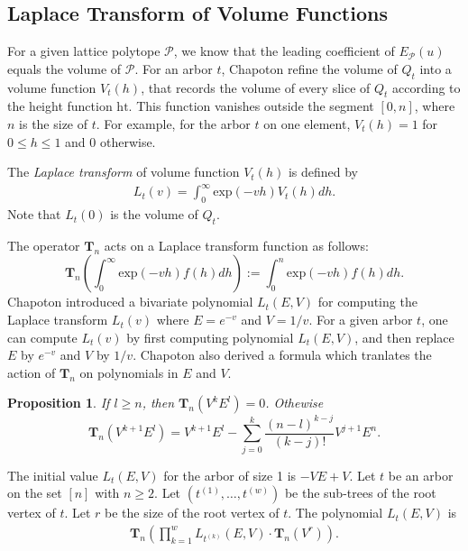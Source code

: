 \documentclass[reqno, 12pt]{article}
\newtheorem{prop}[thm]{Proposition}
\theoremstyle{mydefinition}
\theoremstyle{myremark}
\begin{document}
\subsection{Laplace Transform of Volume Functions}

For a given lattice polytope $\mathcal{P}$, we know that the leading coefficient of $E_{\mathcal{P}}(u)$ equals the volume of $\mathcal{P}$.
For an arbor $t$, Chapoton refine the volume of $Q_t$ into a volume function $V_t(h)$, that records the volume of every slice of $Q_t$ according to the height function $\mathrm{ht}$. This function vanishes outside the segment $[0,n]$, where $n$ is the size of $t$.
For example, for the arbor $t$ on one element, $V_t(h)=1$ for $0\leq h\leq 1$ and $0$ otherwise.

The \emph{Laplace transform} of volume function $V_t(h)$ is defined by 
\begin{align*}
L_t(v)=\int_0^{\infty} \mathrm{exp}(-vh) V_t(h) dh.
\end{align*}
Note that $L_t(0)$ is the volume of $Q_t$.


The operator $\mathbf{T}_n$ acts on a Laplace transform function as follows:
$$\mathbf{T}_{n}\left(\int_0^{\infty} \mathrm{exp}(-vh) f(h) dh\right):=\int_0^{n} \mathrm{exp}(-vh) f(h) dh.$$
Chapoton \cite[Section 2.3]{Chapoton} introduced a bivariate polynomial $L_t(E,V)$ for computing the Laplace transform $L_t(v)$ where $E=e^{-v}$ and $V=1/v$.
For a given arbor $t$, one can compute $L_t(v)$ by first computing polynomial $L_t(E, V)$, and then replace $E$ by $e^{-v}$ and $V$ by $1/v$. Chapoton also derived a formula which tranlates the action of $\mathbf{T}_n$ on polynomials in $E$ and $V$.

\begin{prop}{\em \cite[Lemma 2.5]{Chapoton}}\label{OperatorT_n}
If $l\geq n$, then $\mathbf{T}_{n}(V^{k}E^{l})=0$. Othewise
$$\mathbf{T}_{n}(V^{k+1}E^{l})=V^{k+1}E^{l}-\sum_{j=0}^{k}\frac{(n-l)^{k-j}}{(k-j)!}V^{j+1}E^{n}.$$
\end{prop}

The initial value $L_t(E, V)$ for the arbor of size 1 is $-VE + V$.
Let $t$ be an arbor on the set $[n]$ with $n \geq 2$. 
Let $(t^{(1)}, \ldots, t^{(w)})$ be the sub-trees of the root vertex of $t$. 
Let $r$ be the size of the root vertex of $t$.
The polynomial $L_t(E, V)$ is 
\begin{align}\label{Proposition-2.6}
\mathbf{T}_n \left( \prod_{k=1}^w L_{t^{(k)}}(E, V) \cdot \mathbf{T}_n(V^r) \right).
\end{align}
\end{document}

